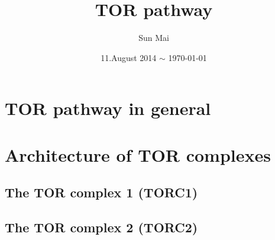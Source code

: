\documentclass[a4paper, 11pt]{article}
\begin{document}
\title{TOR pathway}
\author{Sun Mai}
\date{11.August 2014 $\sim$ \today}
\maketitle

\pagestyle{fancy}
\fancyhead{}
\fancyhead[R]{\slshape \leftmark}
\fancyfoot[C]{\thepage}

\newpage
\tableofcontents

\newpage
\sloppy
\section{TOR pathway in general}
	\subsection{}
		\paragraph{}
\section{Architecture of TOR complexes}
	\subsection{The TOR complex 1 (TORC1)}
	\subsection{The TOR complex 2 (TORC2)}


\renewcommand{\bibname}{References} %
\end{document}
